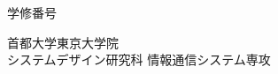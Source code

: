 \newpage
\thispagestyle{empty}
{\raggedleft
  \normalsize 学修番号 \studentnumber \\
}
\vspace*{9truemm}
\begin{center}
 \Large\bf\jdoctitle
\end{center}
\vspace*{27truemm}
\begin{center}
 \Large\bf\jtitle
\end{center}
\vspace*{18truemm}
\begin{center}
 \Large\jauthor
\end{center}
\vspace*{50truemm}
\begin{center}
 \jdate
\end{center}
\vspace*{4.5truemm}
\begin{center}
 首都大学東京大学院 \\
 システムデザイン研究科 情報通信システム専攻
\end{center}
\vspace*{\fill}